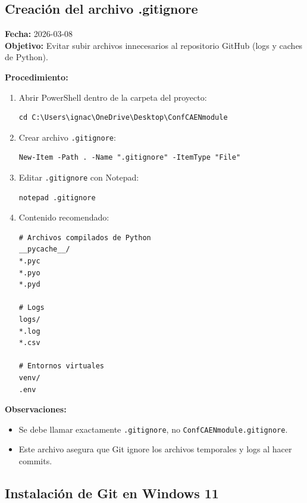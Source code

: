 \documentclass{article}
\begin{document}
\subsection{Creación del archivo .gitignore}

\textbf{Fecha:} 2026-03-08 \\
\textbf{Objetivo:} Evitar subir archivos innecesarios al repositorio GitHub (logs y caches de Python).

\textbf{Procedimiento:}

\begin{enumerate}
    \item Abrir PowerShell dentro de la carpeta del proyecto:
    \begin{verbatim}
cd C:\Users\ignac\OneDrive\Desktop\ConfCAENmodule
    \end{verbatim}

    \item Crear archivo \texttt{.gitignore}:
    \begin{verbatim}
New-Item -Path . -Name ".gitignore" -ItemType "File"
    \end{verbatim}

    \item Editar \texttt{.gitignore} con Notepad:
    \begin{verbatim}
notepad .gitignore
    \end{verbatim}

    \item Contenido recomendado:
    \begin{verbatim}
# Archivos compilados de Python
__pycache__/
*.pyc
*.pyo
*.pyd

# Logs
logs/
*.log
*.csv

# Entornos virtuales
venv/
.env
    \end{verbatim}
\end{enumerate}

\textbf{Observaciones:} 
\begin{itemize}
    \item Se debe llamar exactamente \texttt{.gitignore}, no \texttt{ConfCAENmodule.gitignore}.
    \item Este archivo asegura que Git ignore los archivos temporales y logs al hacer commits.
\end{itemize}

\subsection{Instalación de Git en Windows 11}
\end{document}
